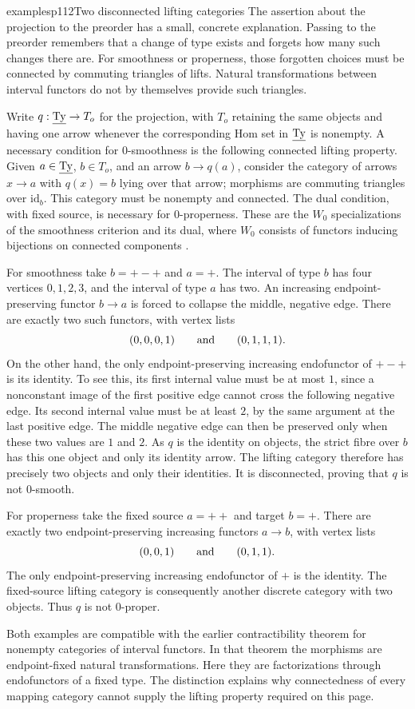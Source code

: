 \begin{dcomment}{examples}{p112}{Two disconnected lifting categories}
The assertion about the projection to the preorder has a small, concrete explanation.  Passing to the preorder remembers that a change of type exists and forgets how many such changes there are.  For smoothness or properness, those forgotten choices must be connected by commuting triangles of lifts.  Natural transformations between interval functors do not by themselves provide such triangles.

Write $q:\underline{\mathrm{Ty}}\to T_o$ for the projection, with $T_o$ retaining the same objects and having one arrow whenever the corresponding Hom set in $\underline{\mathrm{Ty}}$ is nonempty.  A necessary condition for $0$-smoothness is the following connected lifting property.  Given $a\in\underline{\mathrm{Ty}}$, $b\in T_o$, and an arrow $b\to q(a)$, consider the category of arrows $x\to a$ with $q(x)=b$ lying over that arrow; morphisms are commuting triangles over $\mathrm{id}_b$.  This category must be nonempty and connected.  The dual condition, with fixed source, is necessary for $0$-properness.  These are the $W_0$ specializations of the smoothness criterion and its dual, where $W_0$ consists of functors inducing bijections on connected components \citep[Theorem~1.2(b), p.~4]{Maltsiniotis2005Asphericite}.

For smoothness take $b=+-+$ and $a=+$.  The interval of type $b$ has four vertices $0,1,2,3$, and the interval of type $a$ has two.  An increasing endpoint-preserving functor $b\to a$ is forced to collapse the middle, negative edge.  There are exactly two such functors, with vertex lists
\[
 (0,0,0,1)\qquad\hbox{and}\qquad(0,1,1,1).
\]
On the other hand, the only endpoint-preserving increasing endofunctor of $+-+$ is its identity.  To see this, its first internal value must be at most $1$, since a nonconstant image of the first positive edge cannot cross the following negative edge.  Its second internal value must be at least $2$, by the same argument at the last positive edge.  The middle negative edge can then be preserved only when these two values are $1$ and $2$.  As $q$ is the identity on objects, the strict fibre over $b$ has this one object and only its identity arrow.  The lifting category therefore has precisely two objects and only their identities.  It is disconnected, proving that $q$ is not $0$-smooth.

For properness take the fixed source $a=++$ and target $b=+$.  There are exactly two endpoint-preserving increasing functors $a\to b$, with vertex lists
\[
 (0,0,1)\qquad\hbox{and}\qquad(0,1,1).
\]
The only endpoint-preserving increasing endofunctor of $+$ is the identity.  The fixed-source lifting category is consequently another discrete category with two objects.  Thus $q$ is not $0$-proper.

Both examples are compatible with the earlier contractibility theorem for nonempty categories of interval functors.  In that theorem the morphisms are endpoint-fixed natural transformations.  Here they are factorizations through endofunctors of a fixed type.  The distinction explains why connectedness of every mapping category cannot supply the lifting property required on this page.
\end{dcomment}


